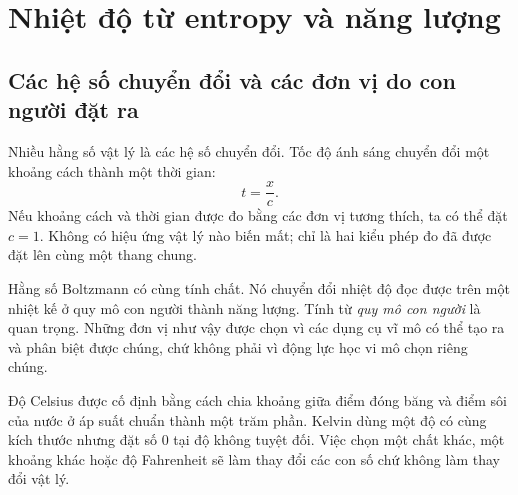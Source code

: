 \chapter{Nhiệt độ từ entropy và năng lượng}


\section{Các hệ số chuyển đổi và các đơn vị do con người đặt ra}

Nhiều hằng số vật lý là các hệ số chuyển đổi. Tốc độ ánh sáng chuyển đổi một khoảng cách thành một thời gian:
\begin{equation}
 t=\frac{x}{c}.
\end{equation}
Nếu khoảng cách và thời gian được đo bằng các đơn vị tương thích, ta có thể đặt \(c=1\). Không có hiệu ứng vật lý nào biến mất; chỉ là hai kiểu phép đo đã được đặt lên cùng một thang chung.

Hằng số Boltzmann có cùng tính chất. Nó chuyển đổi nhiệt độ đọc được trên một nhiệt kế ở quy mô con người thành năng lượng. Tính từ
\emph{quy mô con người} là quan trọng. Những đơn vị như vậy được chọn vì các dụng cụ vĩ mô có thể tạo ra và phân biệt được chúng, chứ không phải vì động lực học vi mô chọn riêng chúng.

Độ Celsius được cố định bằng cách chia khoảng giữa điểm đóng băng và điểm sôi của nước ở áp suất chuẩn thành một trăm phần. Kelvin dùng một độ có cùng kích thước nhưng đặt số 0 tại độ không tuyệt đối. Việc chọn một chất khác, một khoảng khác hoặc độ Fahrenheit sẽ làm thay đổi các con số chứ không làm thay đổi vật lý.

\begin{classroomqa}
\end{classroomqa}

